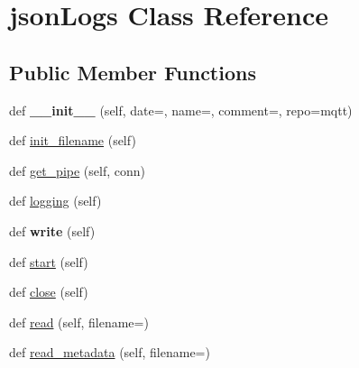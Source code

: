 \hypertarget{classjson_logs_1_1json_logs}{}\section{json\+Logs Class Reference}
\label{classjson_logs_1_1json_logs}
\subsection*{Public Member Functions}
\begin{DoxyCompactItemize}
\item 
\mbox{\label{classjson_logs_1_1json_logs_a062623fd6a2a37fc51eaf06162bc62a4}} 
def {\bfseries \+\_\+\+\_\+init\+\_\+\+\_\+} (self, date=\textquotesingle{}\textquotesingle{}, name=\textquotesingle{}\textquotesingle{}, comment=\textquotesingle{}\textquotesingle{}, repo=\textquotesingle{}mqtt\textquotesingle{})
\item 
def \mbox{\hyperlink{classjson_logs_1_1json_logs_ab81dff542da19a7c4efea4c4111660c7}{init\+\_\+filename}} (self)
\item 
def \mbox{\hyperlink{classjson_logs_1_1json_logs_a80a87c5b622ec948e52d1bbd467a5f7f}{get\+\_\+pipe}} (self, conn)
\item 
def \mbox{\hyperlink{classjson_logs_1_1json_logs_a2f88c2aa4847cb5f1f57b49dc0e1794a}{logging}} (self)
\item 
\mbox{\label{classjson_logs_1_1json_logs_a0c0f007859efa8fae579d20a82ec8704}} 
def {\bfseries write} (self)
\item 
def \mbox{\hyperlink{classjson_logs_1_1json_logs_af1af6ddf04f00f958949618f79c33b82}{start}} (self)
\item 
def \mbox{\hyperlink{classjson_logs_1_1json_logs_a8639372c33e15084a7f7c4d9d87b7bfe}{close}} (self)
\item 
def \mbox{\hyperlink{classjson_logs_1_1json_logs_a79236e82e1d1ede4e7764e8bec7f1ed9}{read}} (self, filename=\textquotesingle{}\textquotesingle{})
\item 
def \mbox{\hyperlink{classjson_logs_1_1json_logs_add2df0fb8f3ad92514b450e14e5ff410}{read\+\_\+metadata}} (self, filename=\textquotesingle{}\textquotesingle{})
\end{DoxyCompactItemize}
